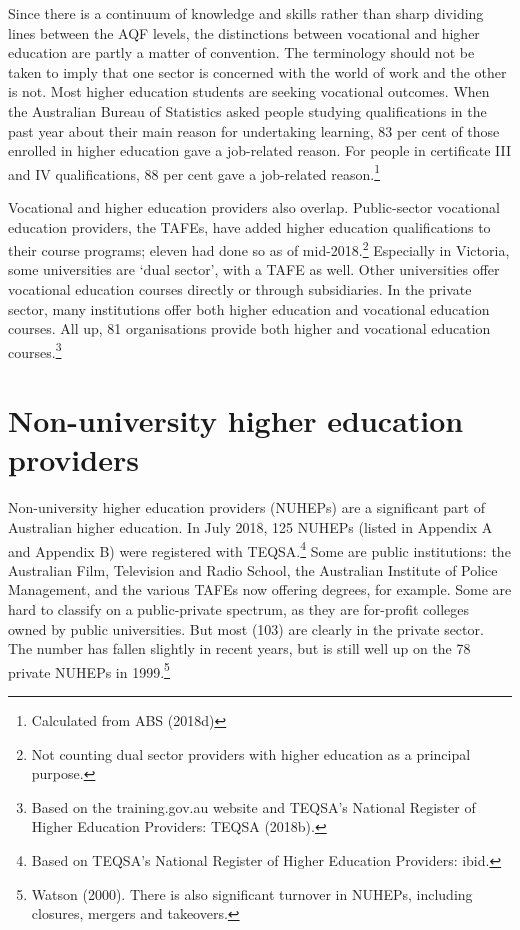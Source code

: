 \documentclass[]{book}
\begin{document}
Since there is a continuum of knowledge and skills rather than sharp dividing lines between the AQF levels, the distinctions between vocational and higher education are partly a matter of convention. The terminology should not be taken to imply that one sector is concerned with the world of work and the other is not. Most higher education students are seeking vocational outcomes. When the Australian Bureau of Statistics asked people studying qualifications in the past year about their main reason for undertaking learning, 83 per cent of those enrolled in higher education gave a job-related reason. For people in certificate III and IV qualifications, 88 per cent gave a job-related reason.\footnote{Calculated from ABS (2018d)}

Vocational and higher education providers also overlap. Public-sector vocational education providers, the TAFEs, have added higher education qualifications to their course programs; eleven had done so as of mid-2018.\footnote{Not counting dual sector providers with higher education as a principal purpose.} Especially in Victoria, some universities are `dual sector', with a TAFE as well. Other universities offer vocational education courses directly or through subsidiaries. In the private sector, many institutions offer both higher education and vocational education courses. All up, 81 organisations provide both higher and vocational education courses.\footnote{Based on the training.gov.au website and TEQSA's National Register of Higher Education Providers: TEQSA (2018b).}

\hypertarget{non-university-higher-education-providers}{%
\section{Non-university higher education providers}\label{non-university-higher-education-providers}}

Non-university higher education providers (NUHEPs) are a significant part of Australian higher education. In July 2018, 125 NUHEPs (listed in Appendix A and Appendix B) were registered with TEQSA.\footnote{Based on TEQSA's National Register of Higher Education Providers: ibid.} Some are public institutions: the Australian Film, Television and Radio School, the Australian Institute of Police Management, and the various TAFEs now offering degrees, for example. Some are hard to classify on a public-private spectrum, as they are for-profit colleges owned by public universities. But most (103) are clearly in the private sector. The number has fallen slightly in recent years, but is still well up on the 78 private NUHEPs in 1999.\footnote{Watson (2000). There is also significant turnover in NUHEPs, including closures, mergers and takeovers.}
\end{document}
